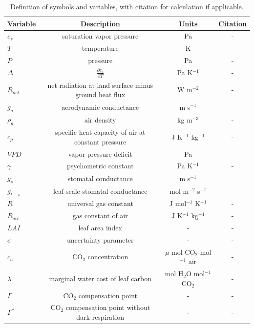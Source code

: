 \documentclass[draft,linenumbers]{gcbjournal}
\begin{document}
\begin{table}

  \caption{Definition of symbols and variables, with citation for calculation if applicable.}
  \label{definitions}
\centering
\small
\begin{tabular}{l c c c}
\hline
 Variable & Description & Units & Citation \\
\hline
$e_s$  & saturation vapor pressure & Pa  & - \\ 
  $T$  & temperature  & K & - \\
  $P$  & pressure & Pa  & - \\
$\Delta$  & $\frac{\partial e_s}{\partial T}$ & Pa K$^{-1}$ & - \\
$R_{net}$  & net radiation at land surface minus ground heat flux & W m$^{-2}$   & - \\
  $g_a$  & aerodynamic conductance & m s$^{-1}$  & \citet{Shuttleworth_2012} \\
  $\rho_a$  & air density & kg m$^{-3}$  & - \\
  $c_p$  & specific heat capacity of air at constant pressure & J K$^{-1}$ kg$^{-1}$ & - \\
  $VPD$  & vapor pressure deficit & Pa  & - \\
  $\gamma$  & psychometric constant & Pa K$^{-1}$   & - \\
  $g_s$  & stomatal conductance & m s$^{-1}$  & \citet{MEDLYN_2011} \\
  $g_{l-s}$  & leaf-scale stomatal conductance & mol m$^{-2}$ s$^{-1}$  & \citet{MEDLYN_2011} \\
  $R$ & universal gas constant & J mol$^{-1}$ K$^{-1}$ & - \\
  $R_{air}$ & gas constant of air & J  K$^{-1}$ kg$^{-1}$ & - \\
  $LAI$ & leaf area index & -& - \\
  $\sigma$ & uncertainty parameter & -& - \\
  $c_a$ & CO$_2$ concentration & $\mu$ mol CO$_2$ mol$^{-1}$ air& - \\
  $\lambda$ & marginal water cost of leaf carbon & mol H$_2$O mol$^{-1}$ CO$_2$ & - \\
  $\Gamma$ & CO$_2$ compensation point & - & - \\
  $\Gamma^*$ & CO$_2$ compensation point without dark respiration & - & - \\
\hline
\end{tabular}
\end{table}
\end{document}
